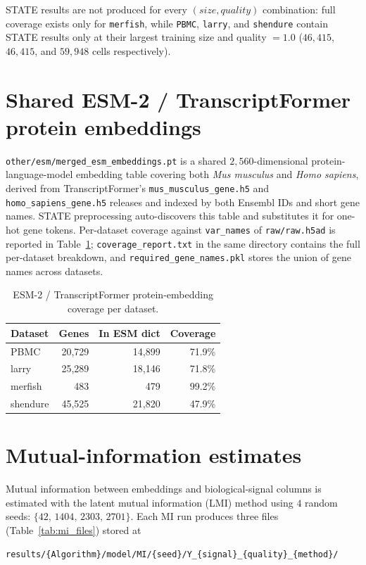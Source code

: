 \documentclass{article}
\begin{document}
STATE results are not produced for every $(\textit{size}, \textit{quality})$ combination: full coverage exists only for \texttt{merfish}, while \texttt{PBMC}, \texttt{larry}, and \texttt{shendure} contain STATE results only at their largest training size and quality $=1.0$ ($46{,}415$, $46{,}415$, and $59{,}948$ cells respectively).

\section{Shared ESM-2 / TranscriptFormer protein embeddings}

\texttt{other/esm/merged\_esm\_embeddings.pt} is a shared $2{,}560$-dimensional protein-language-model embedding table covering both \emph{Mus musculus} and \emph{Homo sapiens}, derived from TranscriptFormer's \texttt{mus\_musculus\_gene.h5} and \texttt{homo\_sapiens\_gene.h5} releases and indexed by both Ensembl IDs and short gene names. STATE preprocessing auto-discovers this table and substitutes it for one-hot gene tokens. Per-dataset coverage against \texttt{var\_names} of \texttt{raw/raw.h5ad} is reported in Table~\ref{tab:esm_coverage}; \texttt{coverage\_report.txt} in the same directory contains the full per-dataset breakdown, and \texttt{required\_gene\_names.pkl} stores the union of gene names across datasets.

\begin{table}[!htbp]
\centering
\caption{ESM-2 / TranscriptFormer protein-embedding coverage per dataset.}
\label{tab:esm_coverage}
\small
\begin{tabular}{lrrr}
\toprule
\textbf{Dataset} & \textbf{Genes} & \textbf{In ESM dict} & \textbf{Coverage} \\
\midrule
PBMC     & 20{,}729 & 14{,}899 & 71.9\% \\
larry    & 25{,}289 & 18{,}146 & 71.8\% \\
merfish  &    483  &    479  & 99.2\% \\
shendure & 45{,}525 & 21{,}820 & 47.9\% \\
\bottomrule
\end{tabular}
\end{table}

\section{Mutual-information estimates}

Mutual information between embeddings and biological-signal columns is estimated with the latent mutual information (LMI) method using $4$ random seeds: $\{42,\, 1404,\, 2303,\, 2701\}$. Each MI run produces three files (Table~\ref{tab:mi_files}) stored at
\begin{lstlisting}
results/{Algorithm}/model/MI/{seed}/Y_{signal}_{quality}_{method}/
\end{lstlisting}
\end{document}
